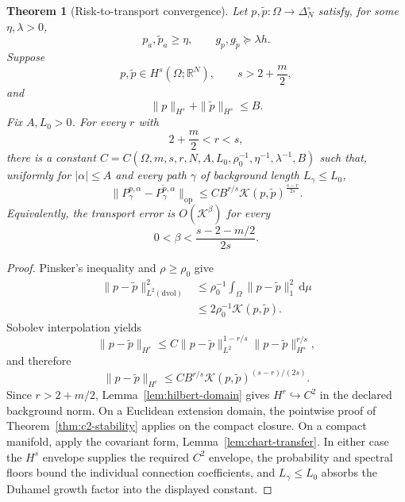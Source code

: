 \documentclass[11pt]{article}
\newtheorem{theorem}{Theorem}[section]
\theoremstyle{definition}
\theoremstyle{remark}
\newcommand{\simplex}{\Delta_{N}^{\circ}}
\newcommand{\R}{\mathbb{R}}
\newcommand{\op}{\mathrm{op}}
\newcommand{\dd}{\mathrm{d}}
\begin{document}
\begin{theorem}[Risk-to-transport convergence]\label{thm:risk-to-transport}
Let $p,\widetilde p:\Omega\to\simplex$ satisfy, for some $\eta,\lambda>0$,
\begin{equation}
  p_a,\widetilde p_a\ge\eta,\qquad
  g_p,g_{\widetilde p}\succeq\lambda h.
\end{equation}
Suppose
\begin{equation}
    p,\widetilde p\in H^s(\Omega;\R^N),\qquad
    s>2+\frac m2,
\end{equation}
and
\begin{equation}
    \|p\|_{H^s}+\|\widetilde p\|_{H^s}\le B.
\end{equation}
Fix $A,L_0>0$. For every $r$ with
\begin{equation}
    2+\frac m2<r<s,
\end{equation}
there is a constant $C=C(\Omega,m,s,r,N,A,L_0,\rho_0^{-1},\eta^{-1},\lambda^{-1},B)$ such that, uniformly for $|\alpha|\le A$ and every path $\gamma$ of background length $L_\gamma\le L_0$,
\begin{equation}
    \|P_\gamma^{p,\alpha}-P_\gamma^{\widetilde p,\alpha}\|_{\op}
    \le C B^{r/s}\mathcal K(p,\widetilde p)^{\frac{s-r}{2s}}.
    \label{eq:risk-to-transport}
\end{equation}
Equivalently, the transport error is $O(\mathcal K^\beta)$ for every
\begin{equation}
    0<\beta<\frac{s-2-m/2}{2s}.
\end{equation}
\end{theorem}

\begin{proof}
Pinsker's inequality and $\rho\ge\rho_0$ give
\begin{equation}
\begin{split}
    \|p-\widetilde p\|_{L^2(\dd\mathrm{vol})}^2
    &\le\rho_0^{-1}\int_\Omega\|p-\widetilde p\|_1^2\,\dd\mu\\
    &\le 2\rho_0^{-1}\mathcal K(p,\widetilde p).
\end{split}
\end{equation}
Sobolev interpolation \citep{adamsFournier2003} yields
\begin{equation}
    \|p-\widetilde p\|_{H^r}
    \le C\|p-\widetilde p\|_{L^2}^{1-r/s}
    \|p-\widetilde p\|_{H^s}^{r/s},
\end{equation}
and therefore
\begin{equation}
    \|p-\widetilde p\|_{H^r}
    \le C B^{r/s}\mathcal K(p,\widetilde p)^{(s-r)/(2s)}.
\end{equation}
Since $r>2+m/2$, Lemma~\ref{lem:hilbert-domain} gives
$H^r\hookrightarrow C^2$ in the declared background norm. On a Euclidean
extension domain, the pointwise proof of Theorem~\ref{thm:c2-stability} applies
on the compact closure. On a compact manifold, apply the covariant form,
Lemma~\ref{lem:chart-transfer}. In either case the $H^s$ envelope supplies the
required $C^2$ envelope, the probability and spectral floors bound the
individual connection coefficients, and $L_\gamma\le L_0$ absorbs the
Duhamel growth factor into the displayed constant.
\end{proof}
\end{document}
